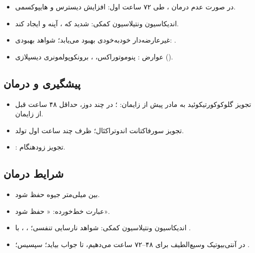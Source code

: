 \documentclass[12pt,a4paper]{article}
\begin{document}
\begin{itemize}
\item در صورت عدم درمان ، طی ۷۲ ساعت اول: افزایش دیسترس و هایپوکسمی.
\item اندیکاسیون ونتیلاسیون کمکی:  شدید که ، آپنه و  ایجاد کند.
\item {} غیرعارضه‌دار خودبه‌خودی بهبود می‌یابد؛ شواهد بهبودی: .
\item عوارض : پنوموتوراکس، ، برونکوپولمونری دیسپلازی ().
\end{itemize}
\subsection*{پیشگیری و درمان }
\begin{itemize}
\item تجویز گلوکوکورتیکوئید به مادر پیش از زایمان: ؛ در چند دوز، حداقل ۴۸ ساعت قبل از زایمان.
\item تجویز سورفاکتانت اندوتراکئال؛ ظرف چند ساعت اول تولد.
\item {}: تجویز زودهنگام.
\end{itemize}
\subsection*{شرایط درمان}
\begin{itemize}
\item {} بین  میلی‌متر جیوه حفظ شود.
\item عبارت خط‌خورده: « حفظ شود».
\item اندیکاسیون ونتیلاسیون کمکی: شواهد نارسایی تنفسی؛
، ،  با .
\item در  آنتی‌بیوتیک وسیع‌الطیف برای ۴۸–۷۲ ساعت می‌دهیم، تا جواب  بیاید؛
 سپسیس؛ .
\end{itemize}

\end{document}
